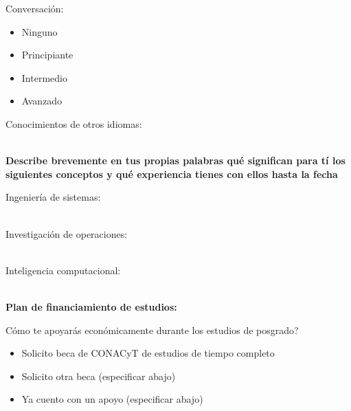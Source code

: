 \documentclass{article}
\begin{document}
\begin{Form}
\begin{multicols}{3}
\columnbreak

Conversación:
\begin{itemize}[itemsep=-2pt]
\item[\raisebox{-4pt}{{\ChoiceMenu[radio,radiosymbol=\ding{52},name=ic]{}{=1}}}]{Ninguno}
\item[\raisebox{-4pt}{{\ChoiceMenu[radio,radiosymbol=\ding{52},name=ic]{}{=2}}}]{Principiante}
\item[\raisebox{-4pt}{{\ChoiceMenu[radio,radiosymbol=\ding{52},name=ic]{}{=3}}}]{Intermedio}
\item[\raisebox{-4pt}{{\ChoiceMenu[radio,radiosymbol=\ding{52},name=ic]{}{=4}}}]{Avanzado}
\end{itemize}

\end{multicols}

Conocimientos de otros idiomas: \\  \\
\TextField[name=idiomas,multiline=true,bordercolor=black,align=0,width=\textwidth,height=15em]{}

\newpage

{\bf Describe brevemente en tus propias palabras qué significan para
  tí los siguientes conceptos y qué experiencia tienes con ellos hasta
  la fecha}

Ingeniería de sistemas: \\ \\
\TextField[name=sis,multiline=true,bordercolor=black,align=0,width=\textwidth,height=8em]{}

Investigación de operaciones: \\ \\
\TextField[name=or,multiline=true,bordercolor=black,align=0,width=\textwidth,height=8em]{}

Inteligencia computacional: \\ \\
\TextField[name=int,multiline=true,bordercolor=black,align=0,width=\textwidth,height=8em]{}

\quad

{\bf Plan de financiamiento de estudios:}

{\textquestiondown}Cómo te apoyarás económicamente durante los
estudios de posgrado?
\begin{itemize}[itemsep=-2pt]
\item[\raisebox{-4pt}{{\ChoiceMenu[radio,radiosymbol=\ding{52},name=ec]{}{=1}}}]{Solicito
    beca de CONACyT de estudios de tiempo completo}
\item[\raisebox{-4pt}{{\ChoiceMenu[radio,radiosymbol=\ding{52},name=ec]{}{=2}}}]{Solicito
    otra beca (especificar abajo)}
\item[\raisebox{-4pt}{{\ChoiceMenu[radio,radiosymbol=\ding{52},name=ec]{}{=3}}}]{Ya cuento
    con un apoyo (especificar abajo)}
\end{itemize}


\end{Form}
\end{document}
